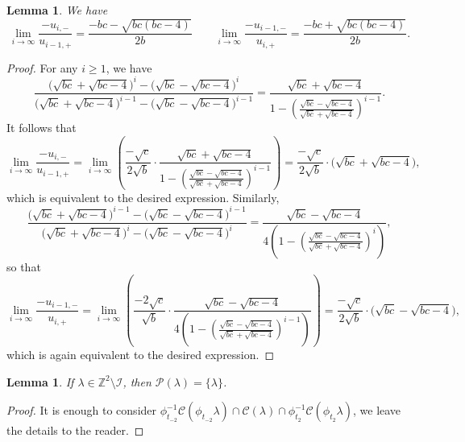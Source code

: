 \documentclass{amsart}
\newtheorem{lemma}[theorem]{Lemma}
\numberwithin{theorem}{section}
\newcommand{\cC}{\mathcal{C}}
\newcommand{\cI}{\mathcal{I}}
\newcommand{\cP}{\mathcal{P}}
\newcommand{\ZZ}{\mathbb{Z}}
\begin{document}
  \begin{lemma}
    We have
    \[\lim_{i\to\infty} \frac{-u_{i,-}}{u_{i-1,+}}=\frac{-bc-\sqrt{bc(bc-4)}}{2b} \qquad \lim_{i\to\infty} \frac{-u_{i-1,-}}{u_{i,+}}=\frac{-bc+\sqrt{bc(bc-4)}}{2b}.\]
  \end{lemma}
  \begin{proof}
    For any $i\ge 1$, we have
    \[\frac{\big(\sqrt{bc}+\sqrt{bc-4}\big)^i-\big(\sqrt{bc}-\sqrt{bc-4}\big)^i}{\big(\sqrt{bc}+\sqrt{bc-4}\big)^{i-1}-\big(\sqrt{bc}-\sqrt{bc-4}\big)^{i-1}}=\frac{\sqrt{bc}+\sqrt{bc-4}}{1-\left(\frac{\sqrt{bc}-\sqrt{bc-4}}{\sqrt{bc}+\sqrt{bc-4}}\right)^{i-1}}.\]
    It follows that
    \[\lim_{i\to\infty} \frac{-u_{i,-}}{u_{i-1,+}} = \lim_{i\to\infty} \left( \frac{-\sqrt{c}}{2\sqrt{b}}\cdot\frac{\sqrt{bc}+\sqrt{bc-4}}{1-\left(\frac{\sqrt{bc}-\sqrt{bc-4}}{\sqrt{bc}+\sqrt{bc-4}}\right)^{i-1}} \right) = \frac{-\sqrt{c}}{2\sqrt{b}}\cdot\big(\sqrt{bc}+\sqrt{bc-4}\big),\]
    which is equivalent to the desired expression.
    Similarly, 
    \[\frac{\big(\sqrt{bc}+\sqrt{bc-4}\big)^{i-1}-\big(\sqrt{bc}-\sqrt{bc-4}\big)^{i-1}}{\big(\sqrt{bc}+\sqrt{bc-4}\big)^i-\big(\sqrt{bc}-\sqrt{bc-4}\big)^i}=\frac{\sqrt{bc}-\sqrt{bc-4}}{4\left(1-\left(\frac{\sqrt{bc}-\sqrt{bc-4}}{\sqrt{bc}+\sqrt{bc-4}}\right)^i\right)},\]
    so that
    \[\lim_{i\to\infty} \frac{-u_{i-1,-}}{u_{i,+}} = \lim_{i\to\infty} \left( \frac{-2\sqrt{c}}{\sqrt{b}}\cdot\frac{\sqrt{bc}-\sqrt{bc-4}}{4\left(1-\left(\frac{\sqrt{bc}-\sqrt{bc-4}}{\sqrt{bc}+\sqrt{bc-4}}\right)^{i-1}\right)} \right) = \frac{-\sqrt{c}}{2\sqrt{b}}\cdot\big(\sqrt{bc}-\sqrt{bc-4}\big),\]
    which is again equivalent to the desired expression.
  \end{proof}

  \begin{lemma}
    If $\lambda\in\ZZ^2\setminus\cI$, then $\cP(\lambda)=\{\lambda\}$.
  \end{lemma}
  \begin{proof}
    It is enough to consider $\phi_{t_{-2}}^{-1}\cC(\phi_{t_{-2}}\lambda) \cap \cC(\lambda) \cap \phi_{t_2}^{-1}\cC(\phi_{t_2}\lambda)$, we leave the details to the reader.
  \end{proof}
\end{document}

